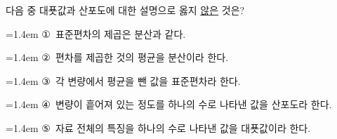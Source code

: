 다음 중 대푯값과 산포도에 대한 설명으로 옳지 \underline{않은} 것은?
\par\medskip\par\noindent\hangindent=1.4em {\small ①}\ 표준편차의 제곱은 분산과 같다.\par\noindent\hangindent=1.4em {\small ②}\ 편차를 제곱한 것의 평균을 분산이라 한다.\par\noindent\hangindent=1.4em {\small ③}\ 각 변량에서 평균을 뺀 값을 표준편차라 한다.\par\noindent\hangindent=1.4em {\small ④}\ 변량이 흩어져 있는 정도를 하나의 수로 나타낸 값을 산포도라 한다.\par\noindent\hangindent=1.4em {\small ⑤}\ 자료 전체의 특징을 하나의 수로 나타낸 값을 대푯값이라 한다.\par\medskip

